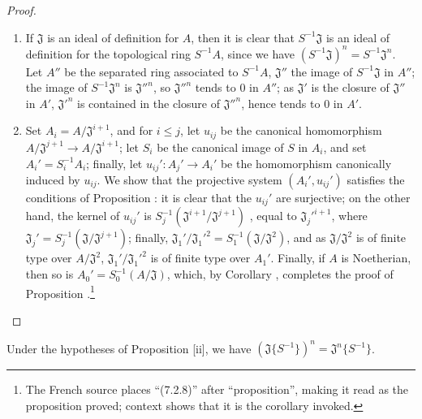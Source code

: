 \begin{proof}
\medskip\noindent
\begin{enumerate}
  \item[(i)] If $\mathfrak{J}$ is an ideal of definition for $A$, then it is clear that
    $S^{-1}\mathfrak{J}$ is an ideal of definition for the topological ring $S^{-1}A$, since we
    have $(S^{-1}\mathfrak{J})^n=S^{-1}\mathfrak{J}^n$. Let $A''$ be the separated ring associated
    to $S^{-1}A$, $\mathfrak{J}''$ the image of $S^{-1}\mathfrak{J}$ in $A''$; the image of
    $S^{-1}\mathfrak{J}^n$ is ${\mathfrak{J}''}^n$, so ${\mathfrak{J}''}^n$ tends to $0$ in $A''$;
    as $\mathfrak{J}'$ is the closure of $\mathfrak{J}''$ in $A'$, ${\mathfrak{J}'}^n$ is contained
    in the closure of ${\mathfrak{J}''}^n$, hence tends to $0$ in $A'$.
  \item[(ii)] Set $A_i=A/\mathfrak{J}^{i+1}$, and for $i\leq j$, let $u_{ij}$ be the canonical
    homomorphism $A/\mathfrak{J}^{j+1}\to A/\mathfrak{J}^{i+1}$; let $S_i$ be the canonical image of
    $S$ in $A_i$, and set $A_i'=S_i^{-1}A_i$; finally, let $u_{ij}':A_j'\to A_i'$ be the homomorphism
    canonically induced by $u_{ij}$. We show that the projective system $(A_i',u_{ij}')$ satisfies
    the conditions of Proposition : it is clear that the $u_{ij}'$
    are surjective; on the other hand, the kernel of $u_{ij}'$ is
    $S_j^{-1}(\mathfrak{J}^{i+1}/\mathfrak{J}^{j+1})$ , equal to
    ${\mathfrak{J}_j'}^{i+1}$, where $\mathfrak{J}_j'=S_j^{-1}(\mathfrak{J}/\mathfrak{J}^{j+1})$;
    finally, $\mathfrak{J}_1'/{\mathfrak{J}_1'}^2=S_1^{-1}(\mathfrak{J}/\mathfrak{J}^2)$, and as
    $\mathfrak{J}/\mathfrak{J}^2$ is of finite type over $A/\mathfrak{J}^2$,
    $\mathfrak{J}_1'/{\mathfrak{J}_1'}^2$ is of finite type over $A_1'$. Finally, if $A$ is
    Noetherian, then so is $A_0'=S_0^{-1}(A/\mathfrak{J})$, which, by Corollary
    , completes the proof of Proposition .\footnote{The French
    source places ``(7.2.8)'' after ``proposition'', making it read as the proposition proved;
    context shows that it is the corollary invoked.}
\end{enumerate}
\end{proof}

\begin{corollary}[7.6.12]
\label{0.7.6.12}
Under the hypotheses of Proposition [ii], we have
$(\mathfrak{J}\{S^{-1}\})^n=\mathfrak{J}^n\{S^{-1}\}$.
\end{corollary}

